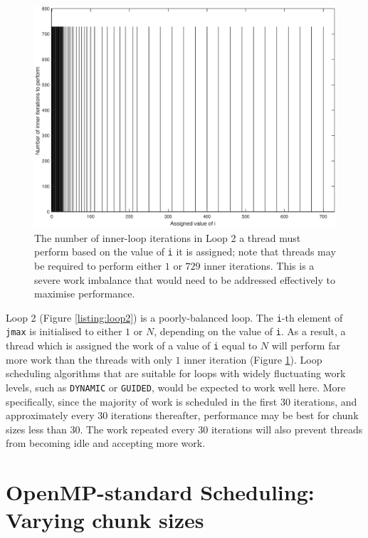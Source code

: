 \documentclass{article} %
\newcommand{\tp}{\texttt}
\begin{document}
\begin{figure}
    \centering
        \includegraphics[height=.3\textheight]{part1_plots/loop2_balancing.eps}
        \caption{The number of inner-loop iterations in Loop 2 a thread must perform based on the value of \tp{i} it is assigned; note that threads may be required to perform either $1$ or $729$ inner iterations. This is a severe work imbalance that would need to be addressed effectively to maximise performance.}
        \label{fig:loop2work}
\end{figure}

Loop 2 (Figure \ref{listing:loop2}) is a poorly-balanced loop.
The \texttt{i}-th element of \texttt{jmax} is initialised to either $1$ or $N$, depending on the value of \texttt{i}.
As a result, a thread which is assigned the work of a value of \texttt{i} equal to $N$ will perform far more work than the threads with only $1$ inner iteration (Figure \ref{fig:loop2work}).
Loop scheduling algorithms that are suitable for loops with widely fluctuating work levels, such as \tp{DYNAMIC} or \tp{GUIDED}, would be expected to work well here.
More specifically, since the majority of work is scheduled in the first 30 iterations, and approximately every 30 iterations thereafter, performance may be best for chunk sizes less than 30.
The work repeated every 30 iterations will also prevent threads from becoming idle and accepting more work.

\section*{OpenMP-standard Scheduling: Varying chunk sizes}
\end{document}

